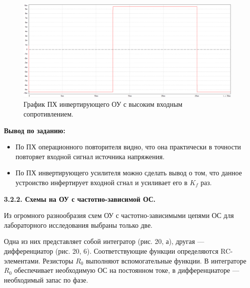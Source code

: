 \documentclass[a4paper,14pt]{extarticle}
\begin{document}
    \begin{figure}[h!]
        \begin{center}
            \includegraphics[scale=0.25]{17.png}
        \end{center}
        \vspace{-0.7cm}
        \caption{График ПХ инвертирующего ОУ с высоким входным сопротивлением.}
    \end{figure}

    \textbf{Вывод по заданию:}

    \begin{itemize}
        \item По ПХ операционного повторителя видно, что она практически в точности повторяет входной сигнал источника напряжения.
        \item По ПХ инвертирующего усилителя можно сделать вывод о том, что данное устроиство инфертирует входной сгнал и усиливает его в $K_f$ раз.
    \end{itemize}


    \begin{center}
        \textbf{3.2.2. Схемы на ОУ с частотно-зависимой ОС.}
    \end{center}

    Из огромного разнообразия схем ОУ с частотно-зависимыми цепями ОС для 
    лабораторного исследования выбраны только две.

    Одна из них представляет собой интегратор (рис. 20, а), 
    другая — дифференциатор (рис. 20, 6). Соответствующие функции 
    определяются RC-элементами. Резисторы $R_0$ выполняют вспомогательные 
    функции. В интеграторе $R_0$ обеспечивает необходимую ОС на постоянном 
    токе, в дифференциаторе — необходимый запас по фазе.
\end{document}
